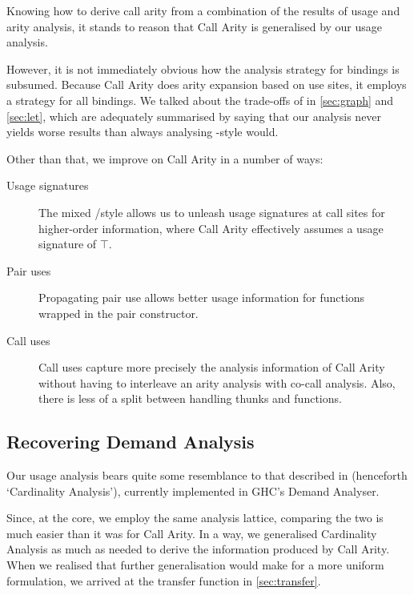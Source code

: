 Knowing how to derive call arity from a combination of the results of usage and arity analysis, it stands to reason that Call Arity is generalised by our usage analysis.

However, it is not immediately obvious how the analysis strategy for  bindings is subsumed.
Because Call Arity does arity expansion based on use sites, it employs a  strategy for all bindings.
We talked about the trade-offs of  \vs {} in \cref{sec:graph} and \cref{sec:let}, which are adequately summarised by saying that our analysis never yields worse results than always analysing -style would.

Other than that, we improve on Call Arity in a number of ways:

\begin{description}
  \item[Usage signatures] The mixed / style allows us to unleash usage signatures at call sites for higher-order information, where Call Arity effectively assumes a usage signature of $\top$.
  \item[Pair uses] Propagating pair use allows better usage information for functions wrapped in the pair constructor.
  \item[Call uses] Call uses capture more precisely the analysis information of Call Arity without having to interleave an arity analysis with co-call analysis. Also, there is less of a split between handling thunks and functions.
\end{description}


\subsection{Recovering Demand Analysis}

Our usage analysis bears quite some resemblance to that described in \textcite{card} (henceforth `Cardinality Analysis'), currently implemented in GHC's Demand Analyser.

Since, at the core, we employ the same analysis lattice, comparing the two is much easier than it was for Call Arity.
In a way, we generalised Cardinality Analysis as much as needed to derive the information produced by Call Arity.
When we realised that further generalisation would make for a more uniform formulation, we arrived at the transfer function in \cref{sec:transfer}.

